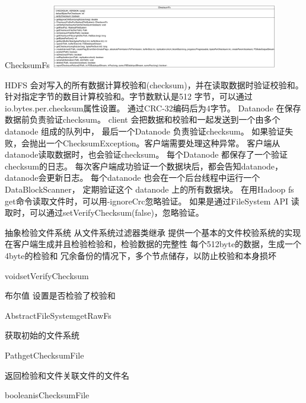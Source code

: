 \begin{XeClass}{ChecksumFs}
\includegraphics[width=10cm]{cdig/ChecksumFs.png}
     
 HDFS 会对写入的所有数据计算校验和(checksum)，并在读取数据时验证校验和。
 针对指定字节的数目计算校验和。字节数默认是512 字节，可以通过io.bytes.per.checksum属性设置。
 通过CRC-32编码后为4字节。
 Datanode 在保存数据前负责验证checksum。
 client 会把数据和校验和一起发送到一个由多个datanode 组成的队列中，
 最后一个Datanode 负责验证checksum。
 如果验证失败，会抛出一个ChecksumException。客户端需要处理这种异常。
 客户端从datanode读取数据时，也会验证checksum。
 每个Datanode 都保存了一个验证checksum的日志。
 每次客户端成功验证一个数据块后，都会告知datanode，datanode会更新日志。
 每个datanode 也会在一个后台线程中运行一个DataBlockScanner，
 定期验证这个 datanode 上的所有数据块。
 在用Hadoop fs get命令读取文件时，可以用-ignoreCrc忽略验证。
 如果是通过FileSystem API 读取时，可以通过setVerifyChecksum(false)，忽略验证。
 
 抽象检验文件系统 从文件系统过滤器类继承
 提供一个基本的文件校验系统的实现
 在客户端生成并且检验检验和，检验数据的完整性
 每个512byte的数据，生成一个4byte的检验和
 冗余备份的情况下，多个节点储存，以防止校验和本身损坏

    \begin{XeMethod}{\XePublic}{void}{setVerifyChecksum}
         
 布尔值 设置是否检验了校验和

    \end{XeMethod}

    \begin{XeMethod}{\XePublic}{AbstractFileSystem}{getRawFs}
         
 获取初始的文件系统

    \end{XeMethod}

    \begin{XeMethod}{\XePublic}{Path}{getChecksumFile}
         
 返回检验和文件关联文件的文件名

    \end{XeMethod}

    \begin{XeMethod}{\XePublic}{boolean}{isChecksumFile}
         

\end{XeMethod}
\end{XeClass}
